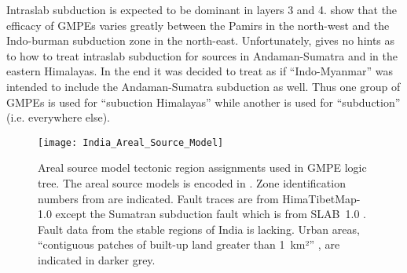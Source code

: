 \documentclass{article}
\begin{document}
Intraslab subduction is expected to be dominant in layers 3 and 4.
\cite{nath2011peak} show that the efficacy of GMPEs varies greatly between the Pamirs in the north-west and the Indo-burman subduction zone in the north-east. Unfortunately, \cite{nath2012probabilistic} gives no hints as to how to treat intraslab subduction for sources in Andaman-Sumatra and in the eastern Himalayas.
In the end it was decided to treat \cite[Figure~3]{nath2012probabilistic} as if ``Indo-Myanmar'' was intended to include the Andaman-Sumatra subduction as well.
Thus one group of GMPEs is used for ``subuction Himalayas'' while another is used for ``subduction'' (i.e. everywhere else).

\begin{figure}
\begin{adjustbox}{center}
\texttt{[image: India\_Areal\_Source\_Model]}
\end{adjustbox}
\caption[Areal source model]{Areal source model tectonic region assignments used in GMPE logic tree.
The areal source models is encoded in \texttt{}.
Zone identification numbers from \cite{nath2012probabilistic} are indicated.
Fault traces are from HimaTibetMap-1.0 \citep{styron2010database} except the Sumatran subduction fault which is from SLAB~1.0 \citep{hayes2012slab1}.
Fault data from the stable regions of India is lacking.
Urban areas, ``contiguous patches of built-up land greater than 1~km²'' \citep{schneider2009new}, are indicated in darker grey.}
\label{fig:ArealSourceModel}
\end{figure}
\end{document}
